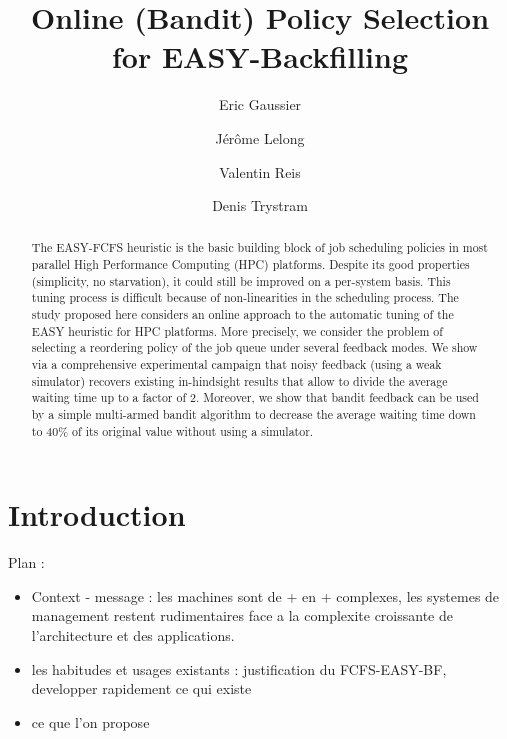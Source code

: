 \documentclass[sigconf]{acmart}
\begin{document}
%
\title{Online (Bandit) Policy Selection for EASY-Backfilling}

\author{Eric Gaussier}
\author{J\'er\^ome Lelong}
\author{Valentin Reis}
\author{Denis Trystram}


\begin{abstract}

  The EASY-FCFS heuristic is the basic building block of job scheduling
  policies in most parallel High Performance Computing (HPC) platforms. Despite
  its good properties (simplicity, no starvation), it could still be improved
  on a per-system basis. This tuning process is difficult because of
  non-linearities in the scheduling process. The study proposed here considers
  an online approach to the automatic tuning of the EASY heuristic for HPC
  platforms. More precisely, we consider the problem of selecting a reordering
  policy of the job queue under several feedback modes. We show via a
  comprehensive experimental campaign that noisy feedback (using a weak
  simulator) recovers existing in-hindsight results that allow to divide the
  average waiting time up to a factor of 2. Moreover, we show that bandit
  feedback can be used by a simple multi-armed bandit algorithm to decrease the
  average waiting time down to 40\% of its original value without using a
  simulator.

\end{abstract}

\maketitle

\section{Introduction}
\label{sec:intro}

Plan :
\begin{itemize}
\item Context - message : les machines sont de + en + complexes, les systemes
de management restent rudimentaires face a la complexite croissante de
l'architecture et des applications.
\item les habitudes et usages existants : justification du FCFS-EASY-BF,
developper rapidement ce qui existe
\item ce que l'on propose
\end{itemize}
\end{document}
